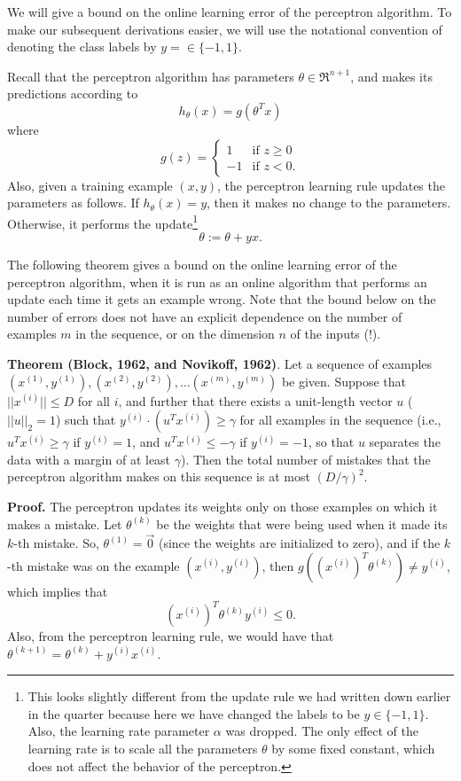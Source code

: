 \documentclass{article}
\begin{document}
We will give a bound on the online learning error of the
perceptron algorithm.  To make our subsequent derivations easier, we will 
use the notational convention of denoting the class labels by
$y= \in \{-1, 1\}$.  

Recall that the perceptron algorithm has 
parameters $\theta \in \Re^{n+1}$, and makes its predictions according to 
\begin{equation}
 h_\theta(x) = g(\theta^Tx)
\end{equation}
where 
\[
g(z) = \left\{\begin{array}{ll}
    1  & \mbox{if~} z \geq 0 \\
    -1  & \mbox{if~} z < 0.
    \end{array} \right.
\]
Also, given a training example $(x,y)$, the perceptron learning
rule updates the parameters as follows.  If $h_\theta(x) = y$, then 
it makes no change to the parameters. 
Otherwise, it performs 
the update\footnote{This looks slightly different from the update rule
we had written down earlier in the quarter 
because here we have changed the labels to be $y \in \{-1,1\}$.  
Also, the learning rate parameter $\alpha$ was dropped.  The only effect of the 
learning rate is to scale all the parameters $\theta$ by some fixed constant,
which does not affect the behavior of the perceptron.}
\[
\theta := \theta + y x.
\]

The following theorem gives a bound on the online learning error of the perceptron 
algorithm, when it is run as an online algorithm that performs an update 
each time it gets an example wrong.  Note that the bound below on the number 
of errors does not have an explicit dependence on the number of
examples $m$ in the sequence, or on the dimension $n$ of the inputs (!).

\bigskip
\noindent 
{\bf Theorem (Block, 1962, and Novikoff, 1962)}.  Let a sequence of
examples 
$(x^{(1)}, y^{(1)}), (x^{(2)}, y^{(2)}),  \ldots (x^{(m)}, y^{(m)})$ be
given. 
Suppose that 
$||x^{(i)}|| \leq D$ for all $i$, and further that there 
exists a unit-length vector $u$
($||u||_2=1$) such that $y^{(i)} \cdot (u^Tx^{(i)}) \geq \gamma$ for all
examples in the sequence (i.e., $u^Tx^{(i)} \geq \gamma$ if $y^{(i)}=1$, 
and $u^Tx^{(i)} \leq -\gamma$ if $y^{(i)}=-1$, so that $u$ separates 
the data with a margin of at least $\gamma$).  Then the total number 
of mistakes that the perceptron algorithm makes on this sequence is at 
most $(D/\gamma)^2$. 

\medskip
\noindent
{\bf Proof.}  
The perceptron updates its weights only on those examples on which it 
makes a mistake.  Let $\theta^{(k)}$ be the weights that were being used 
when it made its $k$-th mistake.  So, $\theta^{(1)} = \vec{0}$ (since 
the weights are initialized to zero), and if the $k$-th mistake was 
on the example $(x^{(i)}, y^{(i)})$, then 
$g( (x^{(i)})^T \theta^{(k)}) \neq y^{(i)}$, 
which implies that 
\begin{equation}
(x^{(i)})^T \theta^{(k)} y^{(i)} \leq 0.  \label{eqn-negsign}
\end{equation}
Also, from the perceptron learning rule, we would have that
$\theta^{(k+1)} = \theta^{(k)} + y^{(i)} x^{(i)}$. 
\end{document}
